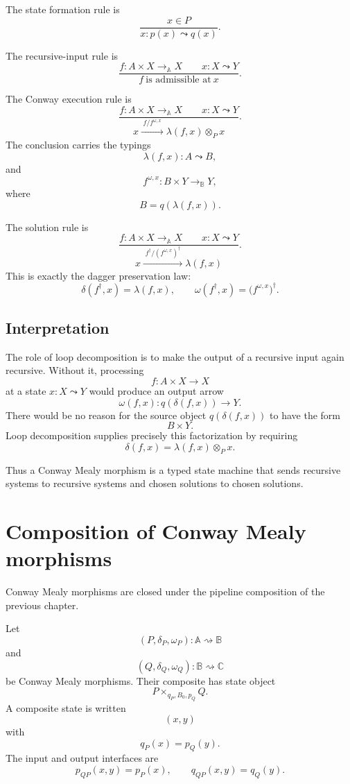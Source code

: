 The state formation rule is
\[
\frac{x\in P}
     {x:p(x)\leadsto q(x)}.
\]

The recursive-input rule is
\[
\frac{
f:A\times X\to_{\mathbb A}X
\qquad
x:X\leadsto Y
}
{
f\ \text{is admissible at}\ x
}.
\]

The Conway execution rule is
\[
\frac{
f:A\times X\to_{\mathbb A}X
\qquad
x:X\leadsto Y
}
{
x
\xrightarrow{\;f/f^{\omega,x}\;}
\lambda(f,x)\otimes_P x
}.
\]
The conclusion carries the typings
\[
\lambda(f,x):A\leadsto B,
\]
and
\[
f^{\omega,x}:B\times Y\to_{\mathbb B}Y,
\]
where
\[
B=q(\lambda(f,x)).
\]

The solution rule is
\[
\frac{
f:A\times X\to_{\mathbb A}X
\qquad
x:X\leadsto Y
}
{
x
\xrightarrow{\;f^\dagger/(f^{\omega,x})^\dagger\;}
\lambda(f,x)
}.
\]
This is exactly the dagger preservation law:
\[
\delta(f^\dagger,x)=\lambda(f,x),
\qquad
\omega(f^\dagger,x)=\bigl(f^{\omega,x}\bigr)^\dagger.
\]

\subsection{Interpretation}
\label{subsec:interpretation-conway-operational}

The role of loop decomposition is to make the output of a recursive input
again recursive.  Without it, processing
\[
f:A\times X\to X
\]
at a state \(x:X\leadsto Y\) would produce an output arrow
\[
\omega(f,x):q(\delta(f,x))\to Y.
\]
There would be no reason for the source object \(q(\delta(f,x))\) to have the
form
\[
B\times Y.
\]
Loop decomposition supplies precisely this factorization by requiring
\[
\delta(f,x)=\lambda(f,x)\otimes_P x.
\]

Thus a Conway Mealy morphism is a typed state machine that sends recursive
systems to recursive systems and chosen solutions to chosen solutions.

\section{Composition of Conway Mealy morphisms}
\label{sec:composition-conway-mealy}

Conway Mealy morphisms are closed under the pipeline composition of the
previous chapter.

Let
\[
(P,\delta_P,\omega_P):\mathbb A\rightsquigarrow\mathbb B
\]
and
\[
(Q,\delta_Q,\omega_Q):\mathbb B\rightsquigarrow\mathbb C
\]
be Conway Mealy morphisms.  Their composite has state object
\[
P\times_{q_P,B_0,p_Q}Q.
\]
A composite state is written
\[
(x,y)
\]
with
\[
q_P(x)=p_Q(y).
\]
The input and output interfaces are
\[
p_{QP}(x,y)=p_P(x),
\qquad
q_{QP}(x,y)=q_Q(y).
\]

